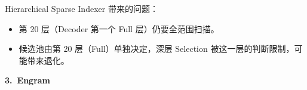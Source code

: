 \documentclass[zihao=false,fontset=windows]{ctexart}
\begin{document}
Hierarchical Sparse Indexer 带来的问题：\par
\begin{itemize}
\item 
第 20 层（Decoder 第一个 Full 层）仍要全范围扫描。\par
\item 
候选池由第 20 层（Full）单独决定，深层 Selection 被这一层的判断限制，可能带来退化。\par
\end{itemize}


\par{}\vspace{0.8em}\noindent \begin{tcolorbox}[boxrule=0pt,arc=3pt,colback=callRed,left=3pt,right=3pt,top=2pt,bottom=2pt,before skip=0pt,after skip=0pt]{\bfseries \textcolor{feishuBlue}{3.}\ Engram}\end{tcolorbox}\par\vspace{0.28em}
\end{document}
